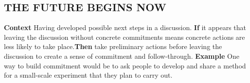 \subsection*{THE FUTURE BEGINS NOW{\hfill\motor}}
\textbf{Context} Having developed possible next steps in a discussion.\newline
\textbf{If} it appears that leaving the discussion without concrete commitments means concrete actions are less likely to take place.\newline \textbf{Then} take preliminary actions before leaving the discussion to create a sense of commitment and follow-through.\newline
\textbf{Example} One way to build commitment would be to ask people to develop and share a method for a small-scale experiment that they plan to carry out.

